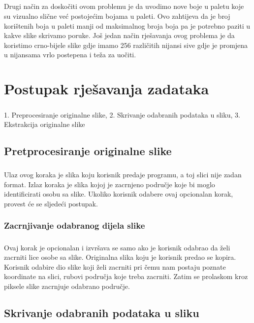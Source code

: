 \documentclass[times, utf8, seminar]{fer}
\begin{document}
\paragraph{}
Drugi način za doskočiti ovom problemu je da uvodimo nove boje u paletu koje su vizualno slične već postojećim bojama u paleti. Ovo zahtijeva da je broj korištenih boja u paleti manji od maksimalnog broja boja pa je potrebno paziti u kakve slike skrivamo poruke. Još jedan način rješavanja ovog problema je da koristimo crno-bijele slike gdje imamo 256 različitih nijansi sive gdje je promjena u nijansama vrlo postepena i teža za uočiti.
\chapter{Postupak rješavanja zadataka}
\paragraph{}
1. Preprocesiranje originalne slike, 2. Skrivanje odabranih podataka u sliku, 3. Ekstrakcija originalne slike
\section{Pretprocesiranje originalne slike}
\paragraph{}
Ulaz ovog koraka je slika koju korisnik predaje programu, a toj slici nije zadan format. Izlaz koraka je slika kojoj je zacrnjeno područje koje bi moglo identificirati osobu sa slike. Ukoliko korisnik odabere ovaj opcionalan korak, provest će se sljedeći postupak.
\subsection{Zacrnjivanje odabranog dijela slike}
\paragraph{}
Ovaj korak je opcionalan i izvršava se samo ako je korisnik odabrao da želi zacrniti lice osobe sa slike. Originalna slika koju je korisnik predao se kopira. Korisnik odabire dio slike koji želi zacrniti pri čemu nam postaju poznate koordinate na slici, rubovi područja koje treba zacrniti. Zatim se prolaskom kroz piksele slike zacrnjuje odabrano područje.
\section{Skrivanje odabranih podataka u sliku}
\end{document}
